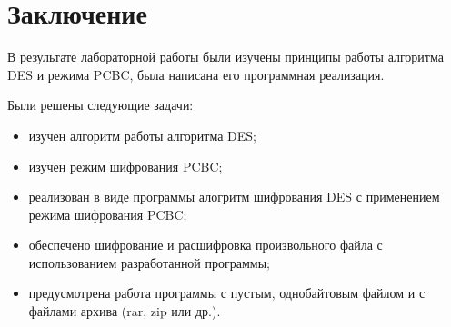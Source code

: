 \chapter*{Заключение}

В результате лабораторной работы были изучены принципы работы алгоритма DES и режима PCBC, была написана его программная реализация.

Были решены следующие задачи:
\begin{itemize}[label=---]
	\item изучен алгоритм работы алгоритма DES;
	\item изучен режим шифрования PCBC;
	\item реализован в виде программы алогритм шифрования DES с применением режима шифрования PCBC;
	\item обеспечено шифрование и расшифровка произвольного файла с использованием разработанной программы;
	\item предусмотрена работа программы с пустым, однобайтовым файлом и с файлами архива (rar, zip или др.).
\end{itemize}
